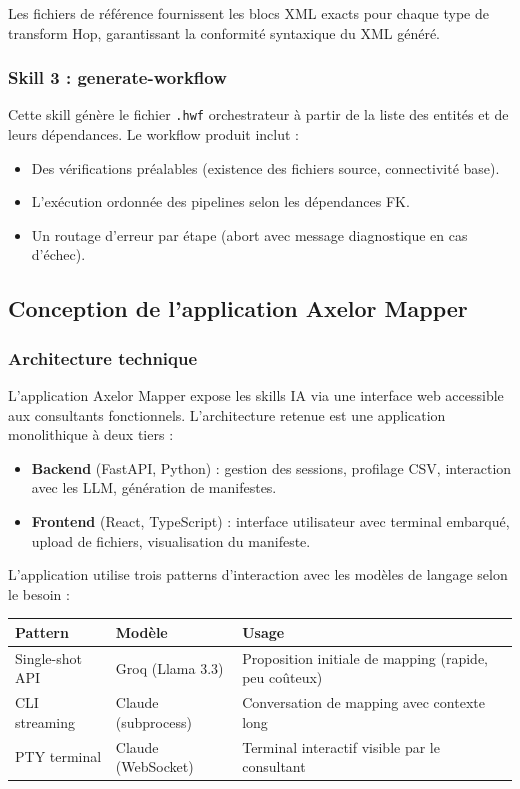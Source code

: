 \documentclass[a4paper,12pt]{article}
\begin{document}
Les fichiers de référence fournissent les blocs XML exacts pour chaque type de transform Hop, garantissant la conformité syntaxique du XML généré.

\subsubsection{Skill 3 : generate-workflow}

Cette skill génère le fichier \texttt{.hwf} orchestrateur à partir de la liste des entités et de leurs dépendances. Le workflow produit inclut :

\begin{itemize}
  \item Des vérifications préalables (existence des fichiers source, connectivité base).
  \item L'exécution ordonnée des pipelines selon les dépendances FK.
  \item Un routage d'erreur par étape (abort avec message diagnostique en cas d'échec).
\end{itemize}

\subsection{Conception de l'application Axelor Mapper}

\subsubsection{Architecture technique}

L'application Axelor Mapper expose les skills IA via une interface web accessible aux consultants fonctionnels. L'architecture retenue est une application monolithique à deux tiers :

\begin{itemize}
  \item \textbf{Backend} (FastAPI, Python) : gestion des sessions, profilage CSV, interaction avec les LLM, génération de manifestes.
  \item \textbf{Frontend} (React, TypeScript) : interface utilisateur avec terminal embarqué, upload de fichiers, visualisation du manifeste.
\end{itemize}

L'application utilise trois patterns d'interaction avec les modèles de langage selon le besoin :

\begin{center}
\begin{tabular}{|p{}|p{}|p{}|}
\hline
\textbf{Pattern} & \textbf{Modèle} & \textbf{Usage} \\
\hline
Single-shot API & Groq (Llama 3.3) & Proposition initiale de mapping (rapide, peu coûteux) \\
\hline
CLI streaming & Claude (subprocess) & Conversation de mapping avec contexte long \\
\hline
PTY terminal & Claude (WebSocket) & Terminal interactif visible par le consultant \\
\hline
\end{tabular}
\end{center}
\end{document}
